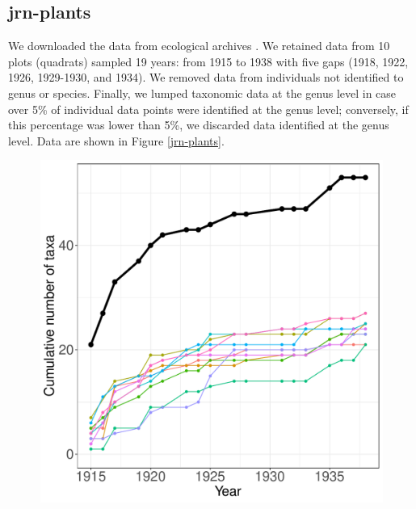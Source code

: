 \documentclass[11pt, oneside]{article}
\begin{document}
\subsection{jrn-plants}
We downloaded the data from ecological archives \citep{chapline_jornada_2017}. We retained data from 10 plots (quadrats) sampled 19 years: from 1915 to 1938 with five gaps (1918, 1922, 1926, 1929-1930, and 1934). We removed data from individuals not identified to genus or species. Finally, we lumped taxonomic data at the genus level in case over 5\% of individual data points were identified at the genus level; conversely, if this percentage was lower than 5\%, we discarded data identified at the genus level. Data are shown in Figure \ref{jrn-plants}.
\begin{figure}[h!]
\centering
\includegraphics[scale = 0.4]{jrn-plants-compagnoni_species_accumulation_curve.pdf}

\end{figure}
\end{document}
